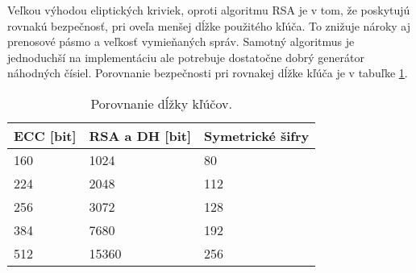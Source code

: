 \documentclass[12pt,a4wide,oneside,openright]{report}
\begin{document}
Veľkou výhodou eliptických kriviek, oproti algoritmu RSA je v tom, že poskytujú rovnakú bezpečnosť, pri oveľa menšej dĺžke použitého kľúča. To znižuje nároky aj prenosové pásmo a veľkosť vymieňaných správ. Samotný algoritmus je jednoduchší na implementáciu ale potrebuje dostatočne dobrý generátor náhodných čísiel. Porovnanie bezpečnosti pri rovnakej dĺžke kľúča je v tabuľke \ref{table:PorovnanieDlzkyKlucov}. 


\begin{table}
	\centering
	\caption{Porovnanie dĺžky kľúčov\cite{ecclesson}.} 
	\label{table:PorovnanieDlzkyKlucov}
	\begin{tabular}{|l|l|l|}
		\hline
		\textbf{ECC} [bit] & \textbf{RSA a DH} [bit] & \textbf{Symetrické šifry} \\
		\hline
				\hline
		160 & 1024 & 80 \\
		\hline
		224 & 2048 & 112 \\
		\hline
		256 & 3072 & 128 \\
		\hline
		384 & 7680 & 192 \\
		\hline
		512 & 15360 & 256 \\
		\hline
	\end{tabular}
\end{table}

\end{document}
